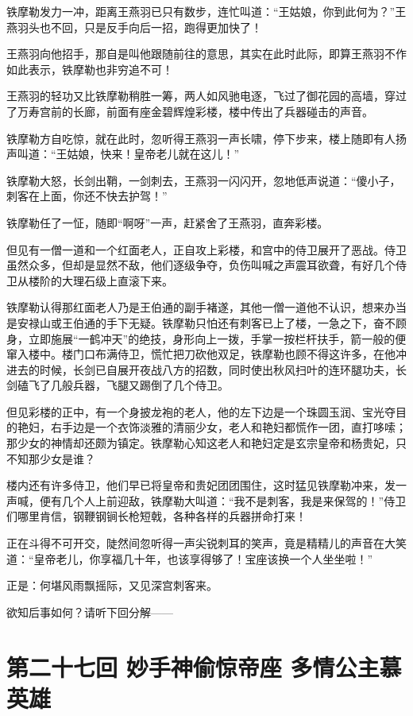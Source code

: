 \documentclass[12pt,oneside]{book}
\begin{document}
铁摩勒发力一冲，距离王燕羽已只有数步，连忙叫道：``王姑娘，你到此何为？''王燕羽头也不回，只是反手向后一招，跑得更加快了！

王燕羽向他招手，那自是叫他跟随前往的意思，其实在此时此际，即算王燕羽不作如此表示，铁摩勒也非穷追不可！

王燕羽的轻功又比铁摩勒稍胜一筹，两人如风驰电逐，飞过了御花园的高墙，穿过了万寿宫前的长廊，前面有座金碧辉煌彩楼，楼中传出了兵器碰击的声音。

铁摩勒方自吃惊，就在此时，忽听得王燕羽一声长啸，停下步来，楼上随即有人扬声叫道：``王姑娘，快来！皇帝老儿就在这儿！''

铁摩勒大怒，长剑出鞘，一剑刺去，王燕羽一闪闪开，忽地低声说道：``傻小子，刺客在上面，你还不快去护驾！''

铁摩勒任了一怔，随即``啊呀''一声，赶紧舍了王燕羽，直奔彩楼。

但见有一僧一道和一个红面老人，正自攻上彩楼，和宫中的侍卫展开了恶战。侍卫虽然众多，但却是显然不敌，他们逐级争夺，负伤叫喊之声震耳欲聋，有好几个侍卫从楼阶的大理石级上直滚下来。

铁摩勒认得那红面老人乃是王伯通的副手褚遂，其他一僧一道他不认识，想来办当是安禄山或王伯通的手下无疑。铁摩勒只怕还有刺客已上了楼，一急之下，奋不顾身，立即施展``一鹤冲天''的绝技，身形向上一拨，手掌一按栏杆扶手，箭一般的便窜入楼中。楼门口布满侍卫，慌忙把刀砍他双足，铁摩勒也顾不得这许多，在他冲进去的时候，长剑已自展开夜战八方的招数，同时使出秋风扫叶的连环腿功夫，长剑磕飞了几般兵器，飞腿又踢倒了几个侍卫。

但见彩楼的正中，有一个身披龙袍的老人，他的左下边是一个珠圆玉润、宝光夺目的艳妇，右手边是一个衣饰淡雅的清丽少女，老人和艳妇都慌作一团，直打哆嗦；那少女的神情却还颇为镇定。铁摩勒心知这老人和艳妇定是玄宗皇帝和杨贵妃，只不知那少女是谁？

楼内还有许多侍卫，他们早已将皇帝和贵妃团团围住，这时猛见铁摩勒冲来，发一声喊，便有几个人上前迎敌，铁摩勒大叫道：``我不是刺客，我是来保驾的！''侍卫们哪里肯信，钢鞭钢锏长枪短戟，各种各样的兵器拼命打来！

正在斗得不可开交，陡然间忽听得一声尖锐刺耳的笑声，竟是精精儿的声音在大笑道：``皇帝老儿，你享福几十年，也该享得够了！宝座该换一个人坐坐啦！''

正是：何堪风雨飘摇际，又见深宫刺客来。

欲知后事如何？请听下回分解------

\chapter{第二十七回 妙手神偷惊帝座
多情公主慕英雄}\label{ux7b2cux4e8cux5341ux4e03ux56de-ux5999ux624bux795eux5077ux60caux5e1dux5ea7-ux591aux60c5ux516cux4e3bux6155ux82f1ux96c4}
\end{document}
